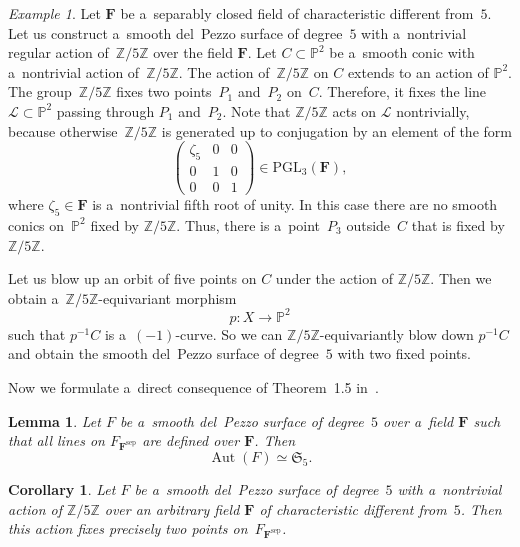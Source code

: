 \documentclass{amsart}
\numberwithin{equation}{section}
\theoremstyle{plain}
\newtheorem{lemma}{Lemma}
\newtheorem{corollary}{Corollary}
\theoremstyle{definition}
\theoremstyle{remark}
\newtheorem{example}{Example}
\begin{document}
\begin{example}
\label{e3}
Let $\mathbf{F}$ be a~separably closed field of characteristic different from~$5$. Let us construct a~smooth del~Pezzo surface of degree~$5$ with a~nontrivial regular action of~$\mathbb{Z}/5\mathbb{Z}$ over the field $\mathbf{F}$. Let $C \subset \mathbb{P}^2$ be a~smooth conic with a~nontrivial action of~$\mathbb{Z}/5\mathbb{Z}$. The action of~$\mathbb{Z}/5\mathbb{Z}$ on $C$ extends to an action of $\mathbb{P}^2$. The group~$\mathbb{Z}/5\mathbb{Z}$ fixes two points~$P_1$ and~$P_2$ on~$C$. Therefore, it fixes the line $\mathcal{L} \subset \mathbb{P}^2$ passing through $P_1$ and~$P_2$. Note that $\mathbb{Z}/5\mathbb{Z}$ acts on $\mathcal{L}$ nontrivially, because otherwise~$\mathbb{Z}/5\mathbb{Z}$ is generated up to conjugation by an element
of the form
$$
\begin{pmatrix}
\zeta_5 & 0 & 0\\
0 & 1 & 0\\
0 & 0 & 1
\end{pmatrix} \in \mathrm{PGL}_3(\mathbf{F}),
$$
where $\zeta_5 \in \mathbf{F}$ is a~nontrivial fifth root of unity.
In this case there are no smooth conics on~$\mathbb{P}^2$ fixed by $\mathbb{Z}/5\mathbb{Z}$. Thus, there is a~point~$P_3$ outside~$C$ that is fixed by~$\mathbb{Z}/5\mathbb{Z}$.

Let us blow up an orbit of five points on $C$ under the action of $\mathbb{Z}/5\mathbb{Z}$. Then we obtain a~$\mathbb{Z}/5\mathbb{Z}$-equivariant morphism
$$
p \colon X \to \mathbb{P}^2
$$
such that $p^{-1}C$ is a~$(-1)$-curve. So we can $\mathbb{Z}/5\mathbb{Z}$-equivariantly blow down $p^{-1}C$ and obtain the smooth del~Pezzo surface of degree~$5$ with two fixed points.
\end{example}

Now we formulate a~direct consequence of Theorem~1.5 in~\cite{19}.

\begin{lemma}
\label{l20}
Let $F$ be a~smooth del~Pezzo surface of degree~$5$ over a~field $\mathbf{F}$ such that all lines on $F_{\mathbf{F}^{\mathrm{sep}}}$ are defined over $\mathbf{F}$. Then
$$
\operatorname{Aut}(F) \simeq \mathfrak{S}_5.
$$
\end{lemma}

\begin{corollary}
\label{c4}
Let $F$ be a~smooth del~Pezzo surface of degree~$5$ with a~nontrivial action of $\mathbb{Z}/5\mathbb{Z}$ over an arbitrary field $\mathbf{F}$ of characteristic different from~$5$. Then this action fixes precisely two points on~$F_{\mathbf{F}^{\mathrm{sep}}}$.
\end{corollary}
\end{document}
